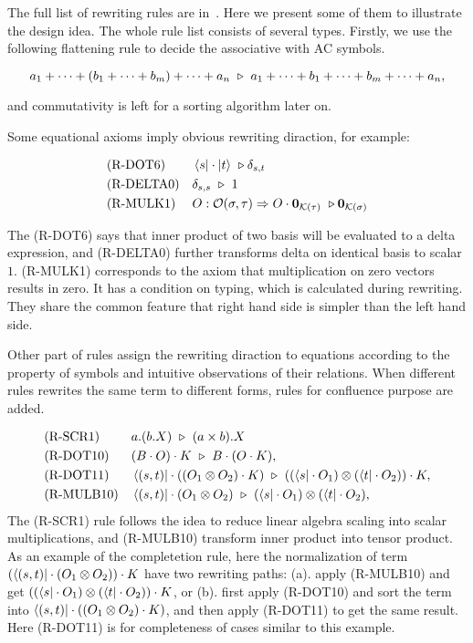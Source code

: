 \documentclass[runningheads]{llncs}
\begin{document}
The full list of rewriting rules are in~. Here we present some of them to illustrate the design idea.
The whole rule list consists of several types.
Firstly, we use the following flattening rule to decide the associative with AC symbols.

\[
a_1 + \cdots + (b_1 + \cdots + b_m) + \cdots + a_n
\ \triangleright\ a_1 + \cdots + b_1 + \cdots + b_m + \cdots + a_n,
\]

and commutativity is left for a sorting algorithm later on.

Some equational axioms imply obvious rewriting diraction, for example:

\begin{align*}
    &\textrm{(R-DOT6)} && \bra{s} \cdot \ket{t} \ \triangleright \delta_{s, t} \\
    &\textrm{(R-DELTA0)} && \delta_{s, s} \ \triangleright\ 1 \\
    &\textrm{(R-MULK1)} && O : \mathcal{O}(\sigma, \tau) \Rightarrow O \cdot \mathbf{0}_{\mathcal{K}(\tau)} \ \triangleright \mathbf{0}_{\mathcal{K}(\sigma)}
\end{align*}

The (R-DOT6) says that inner product of two basis will be evaluated to a delta expression,
and (R-DELTA0) further transforms delta on identical basis to scalar $1$.
(R-MULK1) corresponds to the axiom that multiplication on zero vectors results in zero. It has a condition on typing, which is calculated during rewriting.
They share the common feature that right hand side is simpler than the left hand side.

Other part of rules assign the rewriting diraction to equations according to the property of symbols and intuitive observations of their relations.
When different rules rewrites the same term to different forms, rules for confluence purpose are added.

\begin{align*}
    & \text{(R-SCR1)} 
    && a.(b.X) \ \triangleright\ (a \times b).X \\
    & \text{(R-DOT10)}
    && (B \cdot O) \cdot K \ \triangleright\ B \cdot (O \cdot K), \\
    & \text{(R-DOT11)}
    && \bra{(s, t)} \cdot ((O_1 \otimes O_2) \cdot K) \ \triangleright\ ((\bra{s} \cdot O_1) \otimes (\bra{t} \cdot O_2)) \cdot K, \\
    & \text{(R-MULB10)}
    && \bra{(s, t)} \cdot (O_1 \otimes O_2)\ \triangleright\ (\bra{s} \cdot O_1) \otimes (\bra{t} \cdot O_2),
\end{align*}
The (R-SCR1) rule follows the idea to reduce linear algebra scaling into scalar multiplications,
and (R-MULB10) transform inner product into tensor product. 
As an example of the completetion rule, here the normalization of term $(\bra{(s, t)} \cdot (O_1 \otimes O_2)) \cdot K$ have two rewriting paths: (a). apply (R-MULB10) and get $((\bra{s} \cdot O_1) \otimes (\bra{t} \cdot O_2)) \cdot K$, or
(b). first apply (R-DOT10) and sort the term into $\bra{(s, t)} \cdot ((O_1 \otimes O_2) \cdot K)$, and then apply (R-DOT11) to get the same result. Here (R-DOT11) is for completeness of cases similar to this example.
\end{document}
